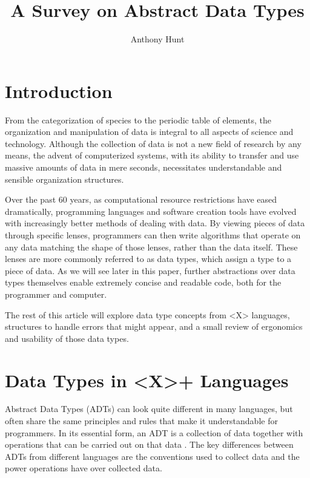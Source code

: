 \documentclass{article}
\title{A Survey on Abstract Data Types}
\author{Anthony Hunt}
\begin{document}
\maketitle

\section{Introduction}

From the categorization of species to the periodic table of elements, the organization and manipulation
of data is integral to all aspects of science and technology. Although the collection of data is not a
new field of research by any means, the advent of computerized systems, with its ability to transfer and use
massive amounts of data in mere seconds, necessitates understandable and sensible organization structures.

Over the past 60 years, as computational resource restrictions have eased dramatically,
programming languages and software creation tools have evolved with increasingly better methods of dealing with data.
By viewing pieces of data through specific lenses, programmers can then write algorithms that operate on
any data matching the shape of those lenses, rather than the data itself. These lenses are more commonly referred to as
data types, which assign a type to a piece of data. As we will see later in this paper,
further abstractions over data types themselves enable extremely concise and readable code,
both for the programmer and computer.

The rest of this article will explore data type concepts from <X> languages, %
structures to handle errors that might appear, and a small review of ergonomics and usability of those data types.

\section{Data Types in <X>+ Languages} %

Abstract Data Types (ADTs) can look quite different in many languages, but often share the same principles and rules
that make it understandable for programmers. In its essential form, an ADT is a collection of data together with
operations that can be carried out on that data \cite{ADTspec}. The key differences between ADTs from different languages
are the conventions used to collect data and the power operations have over collected data.
\end{document}
